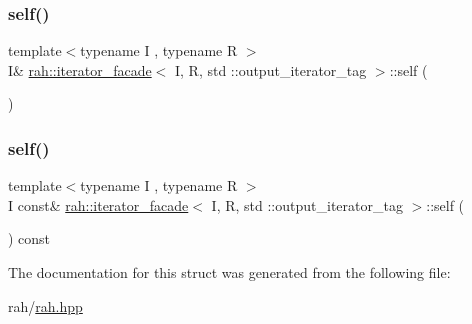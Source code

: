 \subsubsection{\texorpdfstring{self()}{self()}\hspace{0.1cm}{\footnotesize\ttfamily [1/2]}}
{\footnotesize\ttfamily template$<$typename I , typename R $>$ \\
I\& \mbox{\hyperlink{structrah_1_1iterator__facade}{rah\+::iterator\+\_\+facade}}$<$ I, R, std \+::output\+\_\+iterator\+\_\+tag $>$\+::self (\begin{DoxyParamCaption}{ }\end{DoxyParamCaption})\hspace{0.3cm}{\ttfamily [inline]}}

\mbox{\label{structrah_1_1iterator__facade_3_01_i_00_01_r_00_01std_01_1_1output__iterator__tag_01_4_a7241639571b436388ac1ccf4131b4ae2}} 
\subsubsection{\texorpdfstring{self()}{self()}\hspace{0.1cm}{\footnotesize\ttfamily [2/2]}}
{\footnotesize\ttfamily template$<$typename I , typename R $>$ \\
I const\& \mbox{\hyperlink{structrah_1_1iterator__facade}{rah\+::iterator\+\_\+facade}}$<$ I, R, std \+::output\+\_\+iterator\+\_\+tag $>$\+::self (\begin{DoxyParamCaption}{ }\end{DoxyParamCaption}) const\hspace{0.3cm}{\ttfamily [inline]}}



The documentation for this struct was generated from the following file\+:\begin{DoxyCompactItemize}
\item 
rah/\mbox{\hyperlink{rah_8hpp}{rah.\+hpp}}\end{DoxyCompactItemize}
